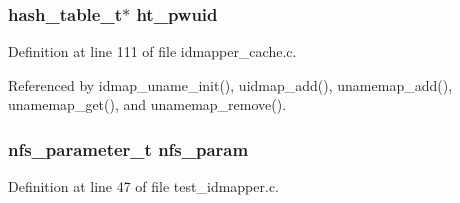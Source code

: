 \subsubsection{\setlength{\rightskip}{0pt plus 5cm}hash\_\-table\_\-t$\ast$ {\bf ht\_\-pwuid}}\label{idmapper__cache_8c_a2}




Definition at line 111 of file idmapper\_\-cache.c.

Referenced by idmap\_\-uname\_\-init(), uidmap\_\-add(), unamemap\_\-add(), unamemap\_\-get(), and unamemap\_\-remove().
\subsubsection{\setlength{\rightskip}{0pt plus 5cm}nfs\_\-parameter\_\-t {\bf nfs\_\-param}}\label{idmapper__cache_8c_a4}




Definition at line 47 of file test\_\-idmapper.c.